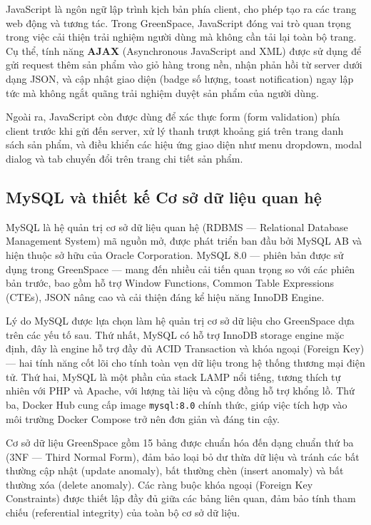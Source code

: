 \documentclass[11pt, a4paper]{article}
\begin{document}
JavaScript là ngôn ngữ lập trình kịch bản phía client, cho phép tạo ra các trang web động và tương tác. Trong GreenSpace, JavaScript đóng vai trò quan trọng trong việc cải thiện trải nghiệm người dùng mà không cần tải lại toàn bộ trang. Cụ thể, tính năng \textbf{AJAX} (Asynchronous JavaScript and XML) được sử dụng để gửi request thêm sản phẩm vào giỏ hàng trong nền, nhận phản hồi từ server dưới dạng JSON, và cập nhật giao diện (badge số lượng, toast notification) ngay lập tức mà không ngắt quãng trải nghiệm duyệt sản phẩm của người dùng.

Ngoài ra, JavaScript còn được dùng để xác thực form (form validation) phía client trước khi gửi đến server, xử lý thanh trượt khoảng giá trên trang danh sách sản phẩm, và điều khiển các hiệu ứng giao diện như menu dropdown, modal dialog và tab chuyển đổi trên trang chi tiết sản phẩm.

\subsection{MySQL và thiết kế Cơ sở dữ liệu quan hệ}

MySQL là hệ quản trị cơ sở dữ liệu quan hệ (RDBMS --- Relational Database Management System) mã nguồn mở, được phát triển ban đầu bởi MySQL AB và hiện thuộc sở hữu của Oracle Corporation. MySQL 8.0 --- phiên bản được sử dụng trong GreenSpace --- mang đến nhiều cải tiến quan trọng so với các phiên bản trước, bao gồm hỗ trợ Window Functions, Common Table Expressions (CTEs), JSON nâng cao và cải thiện đáng kể hiệu năng InnoDB Engine.

Lý do MySQL được lựa chọn làm hệ quản trị cơ sở dữ liệu cho GreenSpace dựa trên các yếu tố sau. Thứ nhất, MySQL có hỗ trợ InnoDB storage engine mặc định, đây là engine hỗ trợ đầy đủ ACID Transaction và khóa ngoại (Foreign Key) --- hai tính năng cốt lõi cho tính toàn vẹn dữ liệu trong hệ thống thương mại điện tử. Thứ hai, MySQL là một phần của stack LAMP nổi tiếng, tương thích tự nhiên với PHP và Apache, với lượng tài liệu và cộng đồng hỗ trợ khổng lồ. Thứ ba, Docker Hub cung cấp image \texttt{mysql:8.0} chính thức, giúp việc tích hợp vào môi trường Docker Compose trở nên đơn giản và đáng tin cậy.

Cơ sở dữ liệu GreenSpace gồm 15 bảng được chuẩn hóa đến dạng chuẩn thứ ba (3NF --- Third Normal Form), đảm bảo loại bỏ dư thừa dữ liệu và tránh các bất thường cập nhật (update anomaly), bất thường chèn (insert anomaly) và bất thường xóa (delete anomaly). Các ràng buộc khóa ngoại (Foreign Key Constraints) được thiết lập đầy đủ giữa các bảng liên quan, đảm bảo tính tham chiếu (referential integrity) của toàn bộ cơ sở dữ liệu.
\newpage
\end{document}
